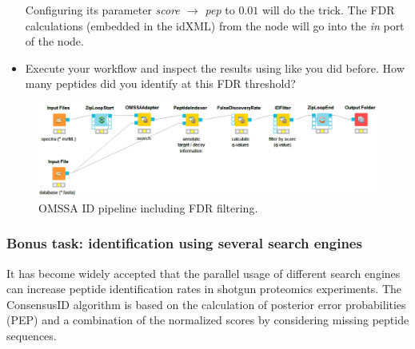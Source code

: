 \begin{itemize}
Configuring its parameter \textit{score $\rightarrow$ pep} to $0.01$ will do the trick.
The FDR calculations (embedded in the idXML) from the  node will go into the \textit{in} port of the  node.
\item
Execute your workflow and inspect the results using  like you did before.
How many peptides did you identify at this FDR threshold?
\end{itemize}

\begin{figure}[htbp]
  \centering
  \includegraphics[width=\textwidth]{graphics/labelfree/PepIdFDR.png}
  \caption{OMSSA ID pipeline including FDR filtering.}
  \label{fig:id_fdr}
\end{figure}

\subsubsection{Bonus task: identification using several search engines}
It has become widely accepted that the parallel usage of different search engines can increase peptide identification rates in shotgun proteomics experiments. The ConsensusID algorithm is based on the calculation of posterior error probabilities (PEP) and a combination of the normalized scores by considering missing peptide sequences.


